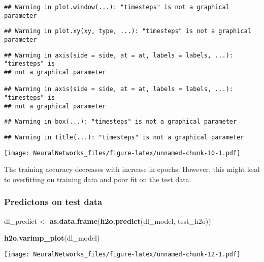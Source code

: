 \documentclass[]{article}
\newenvironment{Shaded}{\begin{snugshade}}{\end{snugshade}}
\newcommand{\KeywordTok}[1]{\textcolor[rgb]{0.13,0.29,0.53}{\textbf{#1}}}
\newcommand{\StringTok}[1]{\textcolor[rgb]{0.31,0.60,0.02}{#1}}
\newcommand{\NormalTok}[1]{#1}
\begin{document}
\begin{verbatim}
## Warning in plot.window(...): "timesteps" is not a graphical parameter
\end{verbatim}

\begin{verbatim}
## Warning in plot.xy(xy, type, ...): "timesteps" is not a graphical parameter
\end{verbatim}

\begin{verbatim}
## Warning in axis(side = side, at = at, labels = labels, ...): "timesteps" is
## not a graphical parameter

## Warning in axis(side = side, at = at, labels = labels, ...): "timesteps" is
## not a graphical parameter
\end{verbatim}

\begin{verbatim}
## Warning in box(...): "timesteps" is not a graphical parameter
\end{verbatim}

\begin{verbatim}
## Warning in title(...): "timesteps" is not a graphical parameter
\end{verbatim}

\texttt{[image: NeuralNetworks\_files/figure-latex/unnamed-chunk-10-1.pdf]}

The training accuracy decreases with increase in epochs. However, this
might lead to overfitting on training data and poor fit on the test
data.

\subsubsection{Predictons on test data}\label{predictons-on-test-data}

\begin{Shaded}
\begin{Highlighting}[]
\NormalTok{dl_predict <-}\StringTok{ }\KeywordTok{as.data.frame}\NormalTok{(}\KeywordTok{h2o.predict}\NormalTok{(dl_model, test_h2o))}
\end{Highlighting}
\end{Shaded}

\begin{Shaded}
\begin{Highlighting}[]
\KeywordTok{h2o.varimp_plot}\NormalTok{(dl_model)}
\end{Highlighting}
\end{Shaded}

\texttt{[image: NeuralNetworks\_files/figure-latex/unnamed-chunk-12-1.pdf]}
\end{document}
